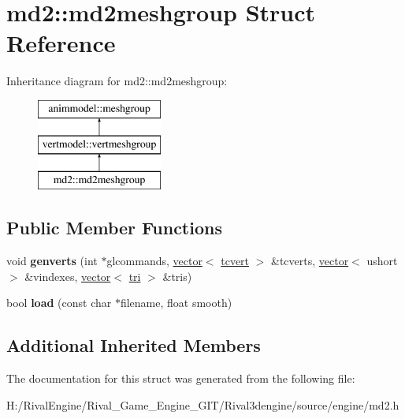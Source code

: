 \hypertarget{structmd2_1_1md2meshgroup}{}\section{md2\+:\+:md2meshgroup Struct Reference}
\label{structmd2_1_1md2meshgroup}
Inheritance diagram for md2\+:\+:md2meshgroup\+:\begin{figure}[H]
\begin{center}
\leavevmode
\includegraphics[height=3.000000cm]{structmd2_1_1md2meshgroup}
\end{center}
\end{figure}
\subsection*{Public Member Functions}
\begin{DoxyCompactItemize}
\item 
\mbox{\label{structmd2_1_1md2meshgroup_a1ce7bf0856ff33328f6b5468c888dc18}} 
void {\bfseries genverts} (int $\ast$glcommands, \hyperlink{structvector}{vector}$<$ \hyperlink{structvertmodel_1_1tcvert}{tcvert} $>$ \&tcverts, \hyperlink{structvector}{vector}$<$ ushort $>$ \&vindexes, \hyperlink{structvector}{vector}$<$ \hyperlink{structvertmodel_1_1tri}{tri} $>$ \&tris)
\item 
\mbox{\label{structmd2_1_1md2meshgroup_ae11501309d2a7e390f2486342aa1f483}} 
bool {\bfseries load} (const char $\ast$filename, float smooth)
\end{DoxyCompactItemize}
\subsection*{Additional Inherited Members}


The documentation for this struct was generated from the following file\+:\begin{DoxyCompactItemize}
\item 
H\+:/\+Rival\+Engine/\+Rival\+\_\+\+Game\+\_\+\+Engine\+\_\+\+G\+I\+T/\+Rival3dengine/source/engine/md2.\+h\end{DoxyCompactItemize}

